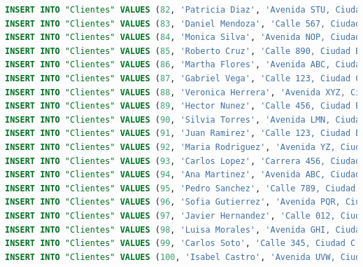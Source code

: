 \documentclass[12pt]{article}
\begin{document}
\begin{lstlisting}[language=SQL]
INSERT INTO "Clientes" VALUES (82, 'Patricia Diaz', 'Avenida STU, Ciudad B', '789-012-3456');
INSERT INTO "Clientes" VALUES (83, 'Daniel Mendoza', 'Calle 567, Ciudad C', '012-345-6789');
INSERT INTO "Clientes" VALUES (84, 'Monica Silva', 'Avenida NOP, Ciudad A', '345-678-9012');
INSERT INTO "Clientes" VALUES (85, 'Roberto Cruz', 'Calle 890, Ciudad B', '678-901-2345');
INSERT INTO "Clientes" VALUES (86, 'Martha Flores', 'Avenida ABC, Ciudad C', '901-234-5678');
INSERT INTO "Clientes" VALUES (87, 'Gabriel Vega', 'Calle 123, Ciudad C', '234-567-8901');
INSERT INTO "Clientes" VALUES (88, 'Veronica Herrera', 'Avenida XYZ, Ciudad A', '567-890-1234');
INSERT INTO "Clientes" VALUES (89, 'Hector Nunez', 'Calle 456, Ciudad B', '890-123-4567');
INSERT INTO "Clientes" VALUES (90, 'Silvia Torres', 'Avenida LMN, Ciudad C', '123-456-7890');
INSERT INTO "Clientes" VALUES (91, 'Juan Ramirez', 'Calle 123, Ciudad B', '123-987-6543');
INSERT INTO "Clientes" VALUES (92, 'Maria Rodriguez', 'Avenida YZ, Ciudad H', '977-654-3210');
INSERT INTO "Clientes" VALUES (93, 'Carlos Lopez', 'Carrera 456, Ciudad C', '456-789-0123');
INSERT INTO "Clientes" VALUES (94, 'Ana Martinez', 'Avenida ABC, Ciudad A', '789-012-3456');
INSERT INTO "Clientes" VALUES (95, 'Pedro Sanchez', 'Calle 789, Ciudad B', '012-345-6789');
INSERT INTO "Clientes" VALUES (96, 'Sofia Gutierrez', 'Avenida PQR, Ciudad C', '345-678-9012');
INSERT INTO "Clientes" VALUES (97, 'Javier Hernandez', 'Calle 012, Ciudad A', '678-901-2345');
INSERT INTO "Clientes" VALUES (98, 'Luisa Morales', 'Avenida GHI, Ciudad B', '901-234-5678');
INSERT INTO "Clientes" VALUES (99, 'Carlos Soto', 'Calle 345, Ciudad C', '234-567-8901');
INSERT INTO "Clientes" VALUES (100, 'Isabel Castro', 'Avenida UVW, Ciudad A', '567-890-1234');
 

\end{lstlisting}
\end{document}
